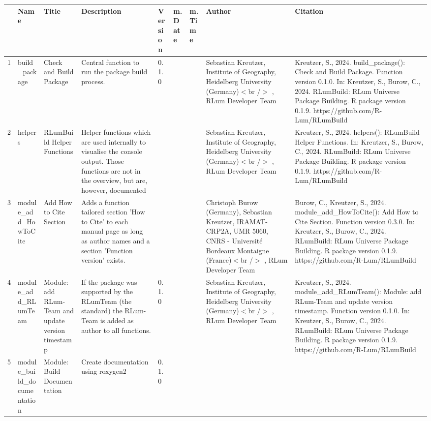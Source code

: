 \begin{table}[ht]
\centering
\begin{tabular}{rllllllll}
  \hline
 & Name & Title & Description & Version & m.Date & m.Time & Author & Citation \\ 
  \hline
1 & build\_package & Check and Build Package & Central function to run the package build process. & 0.1.0
 &  &  & Sebastian Kreutzer, Institute of Geography, Heidelberg University (Germany)$<$br /$>$ , RLum Developer Team & Kreutzer, S., 2024. build\_package(): Check and Build Package. Function version 0.1.0. In: Kreutzer, S., Burow, C., 2024. RLumBuild: RLum Universe Package Building. R package version 0.1.9. https://github.com/R-Lum/RLumBuild
 \\ 
  2 & helpers & RLumBuild Helper Functions & Helper functions which are used internally to visualise the console output. Those functions are not in the overview, but are, however, documented &  &  &  & Sebastian Kreutzer, Institute of Geography, Heidelberg University (Germany)$<$br /$>$ , RLum Developer Team & Kreutzer, S., 2024. helpers(): RLumBuild Helper Functions. In: Kreutzer, S., Burow, C., 2024. RLumBuild: RLum Universe Package Building. R package version 0.1.9. https://github.com/R-Lum/RLumBuild
 \\ 
  3 & module\_add\_HowToCite & Add How to Cite Section & Adds a function tailored section 'How to Cite' to each manual page as long as author names and a section 'Function version' exists. &  &  &  & Christoph Burow (Germany), Sebastian Kreutzer, IRAMAT-CRP2A, UMR 5060, CNRS - Université Bordeaux Montaigne (France)$<$br /$>$ , RLum Developer Team & Burow, C., Kreutzer, S., 2024. module\_add\_HowToCite(): Add How to Cite Section. Function version 0.3.0. In: Kreutzer, S., Burow, C., 2024. RLumBuild: RLum Universe Package Building. R package version 0.1.9. https://github.com/R-Lum/RLumBuild
 \\ 
  4 & module\_add\_RLumTeam & Module: add RLum-Team and update version timestamp & If the package was supported by the RLumTeam (the standard) the RLum-Team is added as author to all functions. & 0.1.0
 &  &  & Sebastian Kreutzer, Institute of Geography, Heidelberg University (Germany)$<$br /$>$ , RLum Developer Team & Kreutzer, S., 2024. module\_add\_RLumTeam(): Module: add RLum-Team and update version timestamp. Function version 0.1.0. In: Kreutzer, S., Burow, C., 2024. RLumBuild: RLum Universe Package Building. R package version 0.1.9. https://github.com/R-Lum/RLumBuild
 \\ 
  5 & module\_build\_documentation & Module: Build Documentation & Create documentation using roxygen2 & 0.1.0

\end{tabular}
\end{table}

